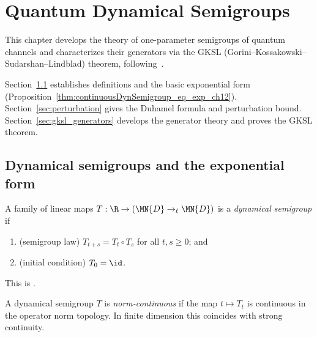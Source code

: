 
\chapter{Quantum Dynamical Semigroups}
\label{ch:semigroup}

This chapter develops the theory of one-parameter semigroups of quantum
channels and characterizes their generators via the
GKSL (Gorini--Kossakowski--Sudarshan--Lindblad) theorem,
following~\cite[Chapter~7]{Wolf2012Quantum}.

Section~\ref{sec:semigroup_defs} establishes definitions and
the basic exponential form
(Proposition~\ref{thm:continuousDynSemigroup_eq_exp_ch12}).
Section~\ref{sec:perturbation} gives the Duhamel formula and
perturbation bound.
Section~\ref{sec:gksl_generators} develops the generator theory
and proves the GKSL theorem.

\section{Dynamical semigroups and the exponential form}
\label{sec:semigroup_defs}

\begin{definition}\label{def:dyn_semigroup_ch12}
    \leanok
    A family of linear maps
    $T : \R \to (\MN{D} \to_{\ell} \MN{D})$
    is a \emph{dynamical semigroup} if
    \begin{enumerate}
        \item (semigroup law) $T_{t+s} = T_t \circ T_s$
              for all $t,s \ge 0$; and
        \item (initial condition) $T_0 = \id$.
    \end{enumerate}
    This is \cite[Equation~(7.1)]{Wolf2012Quantum}.
\end{definition}

\begin{definition}\label{def:continuous_dyn_semigroup_ch12}
    \leanok
    A dynamical semigroup $T$ is \emph{norm-continuous} if the map
    $t \mapsto T_t$ is continuous in the operator norm topology.
    In finite dimension this coincides with strong continuity.
\end{definition}

